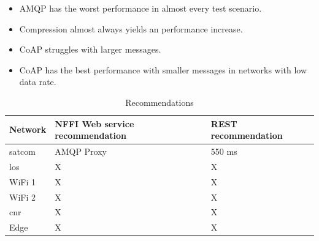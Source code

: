\begin{itemize}
\item AMQP has the worst performance in almost every test scenario.
\item Compression almost always yields an performance increase.
\item CoAP struggles with larger messages.
\item CoAP has the best performance with smaller messages in networks with low data rate.
\end{itemize}

\begin{table}[h]
\begin{tabular}{| l | l | l |}
\hline
  \textbf{Network} & \textbf{NFFI Web service recommendation} & \textbf{REST recommendation}\\ \hline
  \gls{satcom} & AMQP Proxy & 550 ms \\ \hline
  \gls{los} & X & X\\ \hline
  WiFi 1 & X & X \\ \hline
  WiFi 2 & X & X \\ \hline
  \gls{cnr} & X & X \\ \hline
  Edge & X & X\\ \hline
\end{tabular}
\caption{Recommendations}
\label{table-evaluation-summary}
\end{table}
